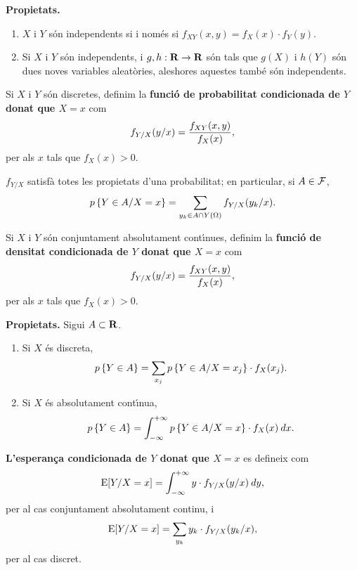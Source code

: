 {\bf Propietats.}
\begin{enumerate}

\item $X$ i $Y$ s\'on independents si i nom\'es si $f_{XY}(x,y) = f_X(x) \cdot
f_Y(y)$.

\item Si $X$ i $Y$ s\'on independents, i $g,h : {\bf R} \to {\bf R}$ s\'on tals que
$g(X)$ i
$h(Y)$ s\'on dues noves variables aleat\`ories, 
aleshores aquestes tamb\'e s\'on independents.
\end{enumerate}

\begin{defin}
Si $X$ i $Y$ s\'on discretes, definim la {\bf funci\'o de probabilitat
condicionada de $Y$ donat que $X = x$}
com $$f_{Y/X}(y/x) = {f_{XY}(x,y) \over f_X(x)},$$
per als $x$ tals que $f_X(x) > 0$.
\end{defin}

$f_{Y/X}$ satisf\`a totes les propietats d'una probabilitat; en particular, si
$A \in{\cal F}$,
$$p\left\{Y \in A / X = x\right\} = \sum_{y_k \in A\cap Y(\Omega)} f_{Y/X}(y_k/x).$$

\begin{defin}
Si $X$ i $Y$ s\'on conjuntament absolutament cont\'{\i}nues, definim la {\bf
funci\'o de densitat condicionada de $Y$ donat que $X = x$}
 com
$$f_{Y/X}(y/x) = {f_{XY}(x,y) \over f_X(x)},$$
per als $x$ tals que $f_X(x) > 0$.
\end{defin}

{\bf Propietats.} Sigui $A \subset {\bf R}$.
\begin{enumerate}
\item Si $X$ \'es discreta,
$$p\left\{Y \in A\right\} = \sum_{x_j} p\left\{Y \in A / X = x_j\right\} \cdot f_X(x_j).$$

\item Si $X$ \'es absolutament cont\'{\i}nua,
$$p\left\{Y \in A\right\} = \int_{-\infty}^{+\infty} p\left\{Y \in A / X = x\right\} \cdot f_X(x) \> dx.$$
\end{enumerate}

\begin{defin}
{\bf L'esperan\c{c}a condicionada de $Y$ donat que $X=x$}
 es defineix com
$${\rm E}[Y/X=x] = \int_{-\infty}^{+\infty} y \cdot f_{Y/X}(y/x) \> dy,$$
per al cas conjuntament absolutament continu, i
$${\rm E}[Y/X=x] = \sum_{y_k} y_k \cdot f_{Y/X}(y_k/x),$$
per al cas discret.
\end{defin}

